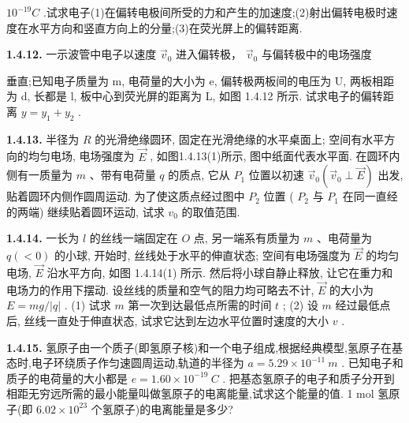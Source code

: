 $10^{-19}C$ .试求电子(1)在偏转电极间所受的力和产生的加速度;(2)射出偏转电极时速度在水平方向和竖直方向上的分量;(3)在荧光屏上的偏转距离.

\begin{center}
\end{center}

\vfill

\textbf{1.4.12.} 一示波管中电子以速度 $\vec{v}_{0}$ 进入偏转极， $\vec{v}_{0}$ 与偏转极中的电场强度


垂直;已知电子质量为 m, 电荷量的大小为 e, 偏转极两板间的电压为 U, 两板相距为 d, 长都是 l, 板中心到荧光屏的距离为 L, 如图 1.4.12 所示. 试求电子的偏转距离 $y = y_{1} + y_{2}$ .

\begin{center}
\end{center}

\vfill

\newpage
\textbf{1.4.13.} 半径为 $R$ 的光滑绝缘圆环, 固定在光滑绝缘的水平桌面上; 空间有水平方向的均匀电场, 电场强度为 $\vec{E}$ , 如图1.4.13(1)所示, 图中纸面代表水平面. 在圆环内侧有一质量为 $m$ 、带有电荷量 $q$ 的质点, 它从 $P_{1}$ 位置以初速 $\vec{v}_{0}(\vec{v}_{0} \perp \vec{E})$ 出发, 贴着圆环内侧作圆周运动. 为了使这质点经过图中 $P_{2}$ 位置 ( $P_{2}$ 与 $P_{1}$ 在同一直经的两端) 继续贴着圆环运动, 试求 $v_{0}$ 的取值范围.

\vfill

\textbf{1.4.14.} 一长为 $l$ 的丝线一端固定在 $O$ 点, 另一端系有质量为 $m$ 、电荷量为 $q (< 0)$ 的小球, 开始时, 丝线处于水平的伸直状态; 空间有电场强度为 $\vec{E}$ 的均匀电场, $\vec{E}$ 沿水平方向, 如图 1.4.14(1) 所示. 然后将小球自静止释放, 让它在重力和电场力的作用下摆动. 设丝线的质量和空气的阻力均可略去不计, $\vec{E}$ 的大小为 $E = mg / |q|$ . (1) 试求 $m$ 第一次到达最低点所需的时间 $t$ ; (2) 设 $m$ 经过最低点后, 丝线一直处于伸直状态, 试求它达到左边水平位置时速度的大小 $v$ .




\begin{center}
\end{center}


\vfill

\newpage
\textbf{1.4.15.} 氢原子由一个质子(即氢原子核)和一个电子组成,根据经典模型,氢原子在基态时,电子环绕质子作匀速圆周运动,轨道的半径为 $a = 5.29 \times 10^{-11} ~m$ . 已知电子和质子的电荷量的大小都是 $e = 1.60 \times 10^{-19} ~C$ . 把基态氢原子的电子和质子分开到相距无穷远所需的最小能量叫做氢原子的电离能量,试求这个能量的值. 1 mol 氢原子(即 $6.02 \times 10^{23}$ 个氢原子)的电离能量是多少?

